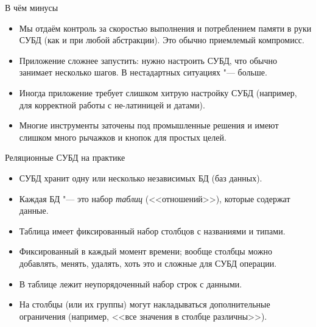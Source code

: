 \begin{frame}{В чём минусы}
	\begin{itemize}
		\item
			Мы отдаём контроль за скоростью выполнения и потреблением памяти в руки СУБД
			(как и при любой абстракции).
			Это обычно приемлемый компромисс.
		\item
			Приложение сложнее запустить: нужно настроить СУБД, что обычно занимает несколько шагов.
			В нестадартных ситуациях "--- больше.
		\item
			Иногда приложение требует слишком хитрую настройку СУБД (например, для корректной работы
			с не-латиницей и датами).
		\item
			Многие инструменты заточены под промышленные решения и имеют слишком много рычажков и кнопок
			для простых целей.
	\end{itemize}
\end{frame}

\begin{frame}{Реляционные СУБД на практике}
	\begin{itemize}
		\item СУБД хранит одну или несколько независимых БД (баз данных).
		\item Каждая БД "--- это набор \textit{таблиц} (<<отношений>>), которые содержат данные.
		\item Таблица имеет фиксированный набор столбцов с названиями и типами.
		\item Фиксированный в каждый момент времени; вообще столбцы можно добавлять, менять, удалять, хоть это и сложные для СУБД операции.
		\item В таблице лежит неупорядоченный набор строк с данными.
		\item На столбцы (или их группы) могут накладываться дополнительные ограничения (например, <<все значения в столбце различны>>).
	\end{itemize}
\end{frame}
